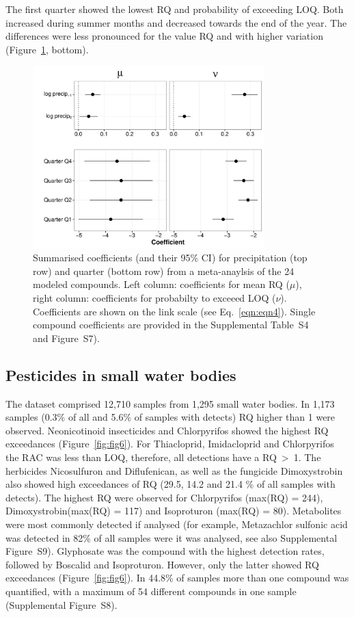 \documentclass[journal=esthag,manuscript=article]{achemso}
\begin{document}
The first quarter showed the lowest RQ and probability of exceeding LOQ.
Both increased during summer months and decreased towards the end of the year.
The differences were less pronounced for the value RQ and with higher variation (Figure~\ref{fig:fig5}, bottom).


\begin{figure}[ht]
  \includegraphics[width=0.8\textwidth]{figure5.pdf}
  \caption{Summarised coefficients (and their 95\% CI) for precipitation (top row) and quarter (bottom row) from a meta-anaylsis of the 24 modeled compounds. Left column: coefficients for mean RQ ($\mu$), right column: coefficients for probabilty to exceeed LOQ ($\nu$). 
  Coefficients are shown on the link scale (see Eq.~\ref{eqn:eqn4}).
  Single compound coefficients are provided in the Supplemental Table~S4 and Figure~S7).
  }
  \label{fig:fig5}
\end{figure}



\subsection{Pesticides in small water bodies}
The dataset comprised 12,710 samples from 1,295 small water bodies.
In 1,173 samples (0.3\% of all and 5.6\% of samples with detects) RQ higher than 1 were observed.
Neonicotinoid insecticides and Chlorpyrifos showed the highest RQ exceedances (Figure~\ref{fig:fig6}).
For Thiacloprid, Imidacloprid and Chlorpyrifos the RAC was less than LOQ, therefore, all detections have a RQ~\textgreater~1. 
The herbicides Nicosulfuron and Diflufenican, as well as the fungicide Dimoxystrobin also showed high exceedances of RQ (29.5, 14.2 and 21.4 \% of all samples with detects).
The highest RQ were observed for Chlorpyrifos (max(RQ) = 244), Dimoxystrobin(max(RQ) = 117) and Isoproturon (max(RQ) = 80). 
Metabolites were most commonly detected if analysed (for example, Metazachlor sulfonic acid was detected in 82\% of all samples were it was analysed, see also Supplemental Figure~S9).
Glyphosate was the compound with the highest detection rates, followed by Boscalid and Isoproturon. 
However, only the latter showed RQ exceedances (Figure~\ref{fig:fig6}).
In 44.8\% of samples more than one compound was quantified, with a maximum of 54 different compounds in one sample (Supplemental Figure~S8). 
\end{document}
